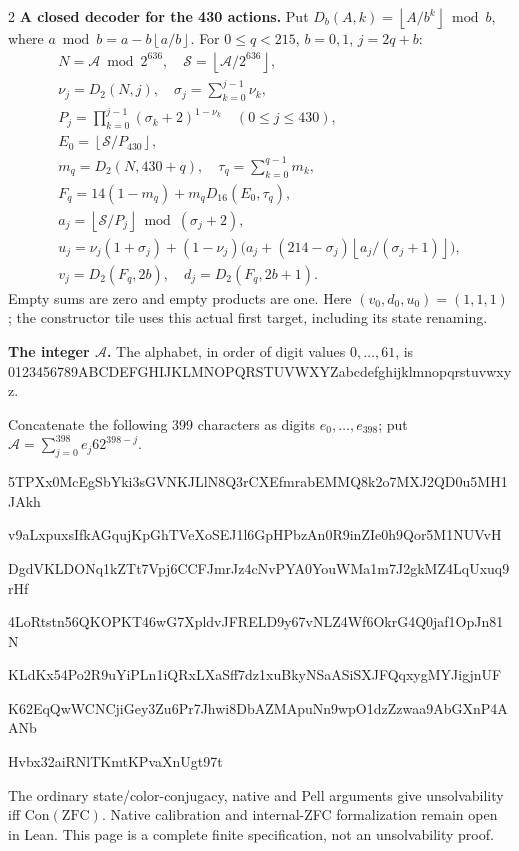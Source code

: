 \documentclass[10pt]{article}
\newcommand{\fl}[1]{\left\lfloor#1\right\rfloor}
\begin{document}
\begin{multicols}{2}
\textbf{A closed decoder for the 430 actions.}
Put $D_b(A,k)=\fl{A/b^k}\bmod b$, where
$a\bmod b=a-b\fl{a/b}$. For $0\le q<215$, $b=0,1$, $j=2q+b$:
\[
\begin{gathered}
N=\mathcal A\bmod2^{636},\quad \mathcal S=\fl{\mathcal A/2^{636}},\\
\nu_j=D_2(N,j),\quad \sigma_j=\sum_{k=0}^{j-1}\nu_k,\\
P_j=\prod_{k=0}^{j-1}(\sigma_k+2)^{1-\nu_k}\quad(0\le j\le430),\\
E_0=\fl{\mathcal S/P_{430}},\\
m_q=D_2(N,430+q),\quad \tau_q=\sum_{k=0}^{q-1}m_k,\\
F_q=14(1-m_q)+m_qD_{16}(E_0,\tau_q),\\
a_j=\fl{\mathcal S/P_j}\bmod(\sigma_j+2),\\
u_j=\nu_j(1+\sigma_j)+(1-\nu_j)\bigl(a_j+(214-\sigma_j)\fl{a_j/(\sigma_j+1)}\bigr),\\
v_j=D_2(F_q,2b),\quad d_j=D_2(F_q,2b+1).
\end{gathered}
\]
Empty sums are zero and empty products are one. Here
$(v_0,d_0,u_0)=(1,1,1)$; the constructor tile
uses this actual first target, including its state renaming.

\textbf{The integer $\mathcal A$.}
The alphabet, in order of digit values $0,\ldots,61$, is
{\fontsize{7.7}{8.2}\selectfont\ttfamily 0123456789ABCDEFGHIJKLMNOPQRSTUVWXYZabcdefghijklmnopqrstuvwxyz}.\par
Concatenate the following 399 characters as digits $e_0,\ldots,e_{398}$;
put $\mathcal A=\sum_{j=0}^{398}e_j62^{398-j}$.\par
\begingroup\fontsize{7.7}{8.2}\selectfont\ttfamily
5TPXx0McEgSbYki3sGVNKJLlN8Q3rCXEfmrabEMMQ8k2o7MXJ2QD0u5MH1JAkh\par
v9aLxpuxsIfkAGqujKpGhTVeXoSEJ1l6GpHPbzAn0R9inZIe0h9Qor5M1NUVvH\par
DgdVKLDONq1kZTt7Vpj6CCFJmrJz4cNvPYA0YouWMa1m7J2gkMZ4LqUxuq9rHf\par
4LoRtstn56QKOPKT46wG7XpldvJFRELD9y67vNLZ4Wf6OkrG4Q0jaf1OpJn81N\par
KLdKx54Po2R9uYiPLn1iQRxLXaSff7dz1xuBkyNSaASiSXJFQqxygMYJigjnUF\par
K62EqQwWCNCjiGey3Zu6Pr7Jhwi8DbAZMApuNn9wpO1dzZzwaa9AbGXnP4AANb\par
Hvbx32aiRNlTKmtKPvaXnUgt97t\par
\endgroup
\normalfont\fontsize{7.7}{8.2}\selectfont
The ordinary state/color-conjugacy, native and Pell arguments give
unsolvability iff $\mathrm{Con}(\mathrm{ZFC})$.
Native calibration and internal-ZFC formalization remain open in Lean.
This page is a complete finite specification, not an unsolvability proof.
\end{multicols}
\end{document}
